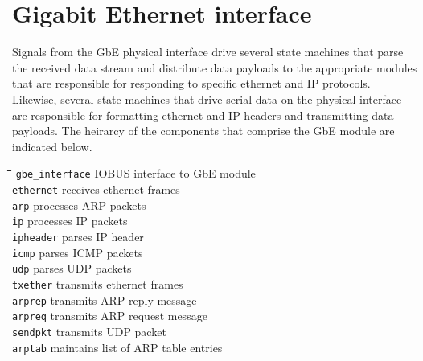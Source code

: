 \documentclass[11pt]{article}
\begin{document}
\section{Gigabit Ethernet interface}
Signals from the GbE physical interface drive several state
machines that parse the received data stream and distribute data payloads
to the appropriate modules that are responsible for responding to specific
ethernet and IP protocols.  Likewise, several state machines that 
drive serial data on the physical interface are responsible for formatting
ethernet and IP headers and transmitting data payloads.  The heirarcy of the
components that comprise the GbE module are indicated below.
\begin{tabbing}
  \hspace*{2cm}\=\hspace*{5mm}\=\hspace*{5mm}\=\hspace*{5mm}\=\hspace*{5cm}\=\hspace*{8cm} \kill
     \> {\tt gbe\_interface} \> \> \> \> IOBUS interface to GbE module \\
     \> \> {\tt ethernet} \> \> \> receives ethernet frames \\
     \> \> \> {\tt arp} \> \> processes ARP packets \\
     \> \> \> {\tt ip} \> \> processes IP packets \\
     \> \> \> \> {\tt ipheader} \> parses IP header \\
     \> \> \> \> {\tt icmp} \> parses ICMP packets \\
     \> \> \> \> {\tt udp} \> parses UDP packets \\
     \> \> {\tt txether} \> \> \> transmits ethernet frames \\
     \> \> \> {\tt arprep} \> \> transmits ARP reply message \\
     \> \> \> {\tt arpreq} \> \> transmits ARP request message \\
     \> \> \> {\tt sendpkt} \> \> transmits UDP packet \\
     \> \> {\tt arptab} \> \> \> maintains list of ARP table entries \\
\end{tabbing}
\end{document}
